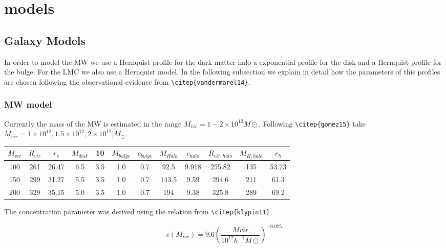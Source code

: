 \chapter{models}\label{sec:models}
\section{Galaxy Models}

In order to model the MW we use a Hernquist profile for the dark matter halo 
a exponential profile for the disk and a Hernquist profile for the bulge. For
the LMC we also use a Hernquist model. In the following subsection we explain 
in detail how the parameters of this profiles are chosen following the observational 
evidence from \verb+\citep{vandermarel14}+. 

\subsection{MW model}

Currently the mass of the MW is estimated in the range $M_{vir} = 1 - 2 \times 10 ^12 M\odot$. Following 
\verb+\citep{gomez15}+ take $M_{vir} = 1 \times 10^{12}, 1.5\times 10^{12}, 2 \times 10^{12}] M_{\odot}$.

\begin{table}[H]{\label{tab:MW}}
\begin{center}
\begin{tabular}{c c c c c c c c c c c c}
\hline
\hline
$M_{vir} $ & $R_{vir}$ & $r_s$ & $M_{disk}$ & 10 & $M_{bulge}$ & $c_{bulge} $ & $M_{Halo}$ & $c_{halo}$ & $R_{vir, halo}$ & $M_{H,halo}$ & $r_h $ \\
\hline
100 & 261 & 26.47 & 6.5 & 3.5 & 1.0 & 0.7 & 92.5 & 9.918 &  255.82 & 135 & 53.73 \\
150 & 299 & 31.27 & 5.5 & 3.5 & 1.0 & 0.7 & 143.5 & 9.59 & 294.6 & 211  & 61.3 \\
200 & 329 & 35.15 & 5.0 & 3.5 & 1.0 & 0.7 & 194 & 9.38 & 325.8 & 289 & 69.2 \\
\hline
\end{tabular}
\end{center}
\end{table}

The concentration parameter was derived using the relation from 
\verb+\citep{klypin11}+ 

\begin{equation}
c(M_{vir}) = 9.6(\dfrac{Mvir}{10^12 h^{-1} M\odot})^{-0.075}
\end{equation}

